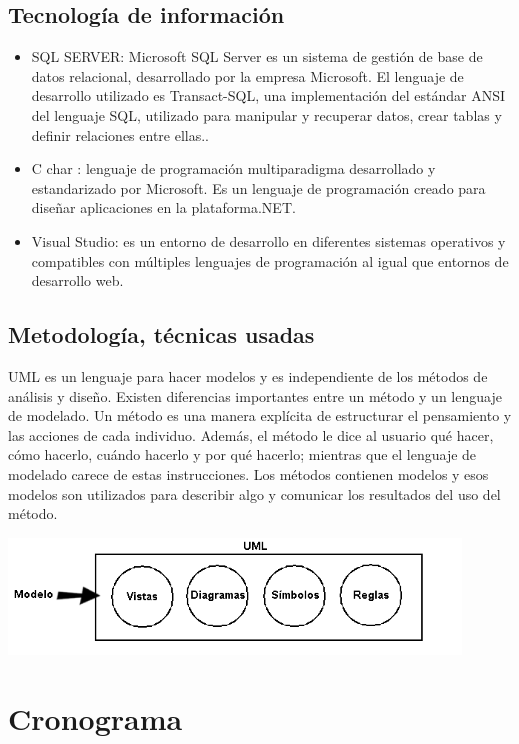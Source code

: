 \documentclass[preprint,12pt]{elsarticle}
\begin{document}
\subsection{\textbf{Tecnología de información  }}
		\begin{itemize}
	\item 	SQL SERVER: Microsoft SQL Server es un sistema de gestión de base de datos relacional, desarrollado por la empresa Microsoft. El lenguaje de desarrollo utilizado es Transact-SQL, una implementación del estándar ANSI del lenguaje SQL, utilizado para manipular y recuperar datos, crear tablas y definir relaciones entre ellas..
	\item 	C char : lenguaje de programación multiparadigma desarrollado y estandarizado por Microsoft. Es un lenguaje de programación creado para diseñar aplicaciones en la plataforma.NET.
	\item 	Visual Studio: es un entorno de desarrollo en diferentes sistemas operativos y compatibles con múltiples lenguajes de programación al igual que entornos de desarrollo web. 
	\end{itemize}
\subsection{\textbf{ Metodología, técnicas usadas  }}
UML es un lenguaje para hacer modelos y es independiente de los métodos de análisis y diseño. Existen diferencias importantes entre un método y un lenguaje de modelado. Un método es una manera explícita de estructurar el pensamiento y las acciones de cada individuo. Además, el método le dice al usuario qué hacer, cómo hacerlo, cuándo hacerlo y por qué hacerlo; mientras que el lenguaje de modelado carece de estas instrucciones. Los métodos contienen modelos y esos modelos son utilizados para describir algo y comunicar los resultados del uso del método.
          \begin{center}
	\includegraphics[width=12cm]{./imagen/5} 
	\end{center}
		
\section{Cronograma }
\end{document}
